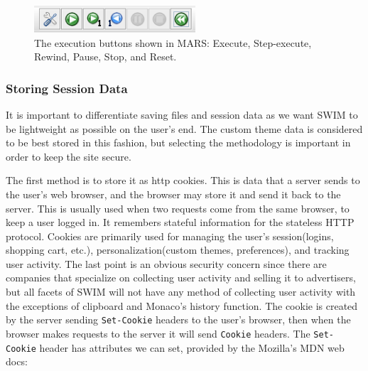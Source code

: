 \documentclass[
    paper=letter,
    parskip=half,
    fontsize=12pt,
    titlepage=firstiscover,
    toc=bibliography,
    numbers=endperiod
]{scrartcl}
\begin{document}
\begin{figure}[H]
    \includegraphics[width=6cm]{mars-execution-buttons}
    \caption{The execution buttons shown in MARS: Execute, Step-execute, Rewind, Pause, Stop, and Reset.}
\end{figure}

\subsubsection{Storing Session Data}
\label{subsec:storing-session-data}

\cite{mdn-cookies, mdn-set-cookie} It is important to differentiate
saving files and session data as we want SWIM to be lightweight as
possible on the user's end. The custom theme data is considered to be
best stored in this fashion, but selecting the methodology is important
in order to keep the site secure.

The first method is to store it as http cookies. This is data that a
server sends to the user's web browser, and the browser may store it and
send it back to the server. This is usually used when two requests come
from the same browser, to keep a user logged in. It remembers stateful
information for the stateless HTTP protocol. Cookies are primarily used
for managing the user's session(logins, shopping cart, etc.),
personalization(custom themes, preferences), and tracking user activity.
The last point is an obvious security concern since there are companies
that specialize on collecting user activity and selling it to
advertisers, but all facets of SWIM will not have any method of
collecting user activity with the exceptions of clipboard and Monaco's
history function.
The cookie is created by the server sending \texttt{Set-Cookie} headers
to the user's browser, then when the browser makes requests to the
server it will send \texttt{Cookie} headers. The \texttt{Set-Cookie}
header has attributes we can set, provided by the Mozilla's MDN web
docs:
\end{document}
